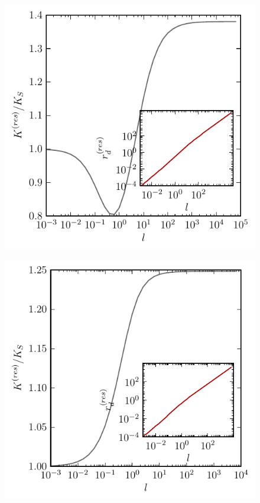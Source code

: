 \begin{minipage}[t]{.5 \textwidth}
    \begin{figure}[H]
        \includegraphics[width = 1 \textwidth]{plots/rep_l.pdf}
    \end{figure}
\end{minipage}\begin{minipage}[t]{.5 \textwidth}
    \begin{figure}[H]
        \includegraphics[width = 1 \textwidth]{plots/att_l.pdf}
    \end{figure}
\end{minipage}\\
